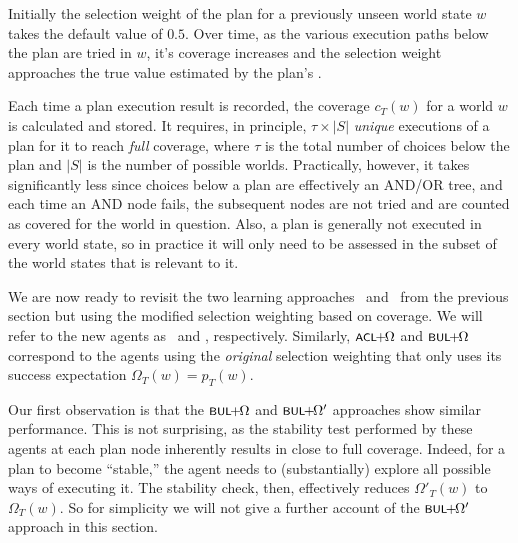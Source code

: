 	
Initially the selection weight of the plan for a previously unseen world state $w$ takes the default value of $0.5$.
Over time, as the various execution paths below the plan are tried in $w$, it's coverage increases 
and the selection weight approaches the true value estimated by the plan's \dt.


Each time a plan execution result is recorded, the coverage
$c_T(w)$ for a world $w$ is calculated and stored.
It requires, in principle, $\tau \times |S|$ \emph{unique} executions of
a plan for it to reach \emph{full} coverage, where $\tau$ is the total number of
choices below the plan and $|S|$ is the number of possible worlds. Practically,
however, it takes significantly less since choices below a plan are effectively
an AND/OR tree, and each time an AND node fails, the subsequent
nodes are not tried and are counted as covered for the world in question.
Also, a plan is generally not executed in every world state, so in
practice it will only need to be assessed in the subset of the world
states that is relevant to it.

\medskip We are now ready to revisit the two
learning approaches \CL\ and \BUL\ from the previous section but using the modified
selection weighting based on coverage. We will refer to the new agents as \CLSELB\
and \BULSELB, respectively.
Similarly, $\CLSELA$ and $\BULSELA$ correspond to the agents using
the \emph{original} selection weighting that only uses 
its \dt success expectation $\Omega_T(w) = p_T(w)$.


Our first observation is that the $\BULSELA$ and $\BULSELB$ approaches show similar performance.
This is not surprising, as the stability test performed by these agents at each
plan node inherently results in close to full coverage. Indeed, for a plan to become
``stable,'' the agent needs to (substantially) explore all possible  ways of
executing it. The stability check, then, effectively reduces
$\Omega'_T(w)$ to $\Omega_T(w)$. 
So for simplicity we will not give a further account of the $\BULSELB$ approach in this section.



